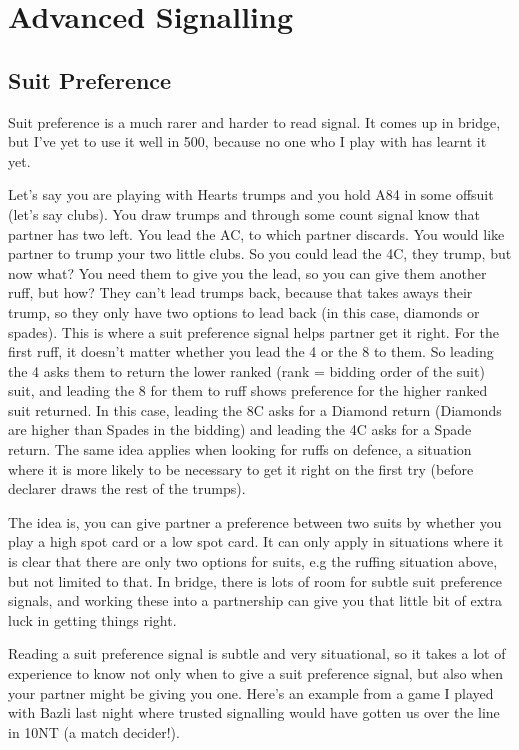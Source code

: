 \documentclass[a4paper]{JoshCards}
\begin{document}
\section*{Advanced Signalling}


\subsection*{Suit Preference}

Suit preference is a much rarer and harder to read signal. It comes up in bridge, but I've yet to use it well in 500, because no one who I play with has learnt it yet.

Let's say you are playing with Hearts trumps and you hold A84 in some offsuit (let's say clubs). You draw trumps and through some count signal know that partner has two left. You lead the AC, to which partner discards. You would like partner to trump your two little clubs. So you could lead the 4C, they trump, but now what? You need them to give you the lead, so you can give them another ruff, but how? They can't lead trumps back, because that takes aways their trump, so they only have two options to lead back (in this case, diamonds or spades). This is where a suit preference signal helps partner get it right. For the first ruff, it doesn't matter whether you lead the 4 or the 8 to them. So leading the 4 asks them to return the lower ranked (rank = bidding order of the suit) suit, and leading the 8 for them to ruff shows preference for the higher ranked suit returned. In this case, leading the 8C asks for a Diamond return (Diamonds are higher than Spades in the bidding) and leading the 4C asks for a Spade return. The same idea applies when looking for ruffs on defence, a situation where it is more likely to be necessary to get it right on the first try (before declarer draws the rest of the trumps).

The idea is, you can give partner a preference between two suits by whether you play a high spot card or a low spot card. It can only apply in situations where it is clear that there are only two options for suits, e.g the ruffing situation above, but not limited to that. In bridge, there is lots of room for subtle suit preference signals, and working these into a partnership can give you that little bit of extra luck in getting things right. 

Reading a suit preference signal is subtle and very situational, so it takes a lot of experience to know not only when to give a suit preference signal, but also when your partner might be giving you one. Here's an example from a game I played with Bazli last night where trusted signalling would have gotten us over the line in 10NT (a match decider!).
\end{document}
